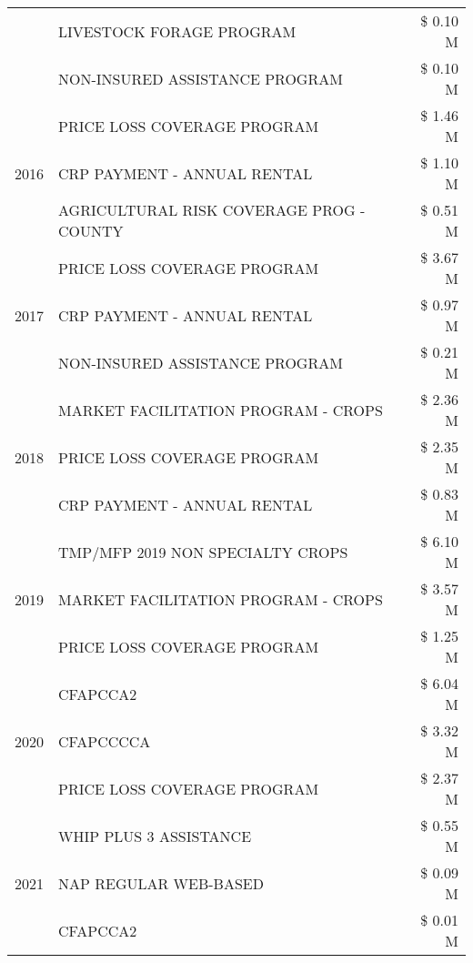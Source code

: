 \begin{tabular}{llr}
 & LIVESTOCK FORAGE PROGRAM & \$ 0.10 M \\
 & NON-INSURED ASSISTANCE PROGRAM & \$ 0.10 M \\
\cline{1-3}
\multirow[t]{3}{*}{2016} & PRICE LOSS COVERAGE PROGRAM & \$ 1.46 M \\
 & CRP PAYMENT - ANNUAL RENTAL & \$ 1.10 M \\
 & AGRICULTURAL RISK COVERAGE PROG - COUNTY & \$ 0.51 M \\
\cline{1-3}
\multirow[t]{3}{*}{2017} & PRICE LOSS COVERAGE PROGRAM & \$ 3.67 M \\
 & CRP PAYMENT - ANNUAL RENTAL & \$ 0.97 M \\
 & NON-INSURED ASSISTANCE PROGRAM & \$ 0.21 M \\
\cline{1-3}
\multirow[t]{3}{*}{2018} & MARKET FACILITATION PROGRAM - CROPS & \$ 2.36 M \\
 & PRICE LOSS COVERAGE PROGRAM & \$ 2.35 M \\
 & CRP PAYMENT - ANNUAL RENTAL & \$ 0.83 M \\
\cline{1-3}
\multirow[t]{3}{*}{2019} & TMP/MFP 2019 NON SPECIALTY CROPS & \$ 6.10 M \\
 & MARKET FACILITATION PROGRAM - CROPS & \$ 3.57 M \\
 & PRICE LOSS COVERAGE PROGRAM & \$ 1.25 M \\
\cline{1-3}
\multirow[t]{3}{*}{2020} & CFAPCCA2 & \$ 6.04 M \\
 & CFAPCCCCA & \$ 3.32 M \\
 & PRICE LOSS COVERAGE PROGRAM & \$ 2.37 M \\
\cline{1-3}
\multirow[t]{3}{*}{2021} & WHIP PLUS 3 ASSISTANCE & \$ 0.55 M \\
 & NAP REGULAR WEB-BASED & \$ 0.09 M \\
 & CFAPCCA2 & \$ 0.01 M \\
\cline{1-3}
\bottomrule
\end{tabular}
